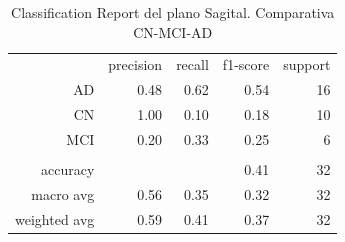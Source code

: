 \begin{table}[H]
    \centering
    \begin{tabular}{r r r r r}
        & precision & recall & f1-score & support \\
        AD & 0.48 & 0.62 & 0.54 & 16 \\
        CN & 1.00 & 0.10 & 0.18 & 10 \\
        MCI & 0.20 & 0.33 & 0.25 & 6 \\
        & & & & \\
        accuracy &  &  & 0.41 & 32 \\
        macro avg & 0.56 & 0.35 & 0.32 & 32 \\
        weighted avg & 0.59 & 0.41 & 0.37 & 32 \\
    \end{tabular}
    \caption{Classification Report del plano Sagital. Comparativa CN-MCI-AD}
    \label{tab:cr-sagital-cn-mci-ad}
\end{table}

